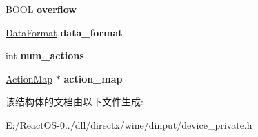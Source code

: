 \begin{DoxyCompactItemize}
B\+O\+OL {\bfseries overflow}
\item 
\mbox{\label{struct_i_direct_input_device_impl_a7a27a9acbe1dfd670ba35ad37ea206e8}} 
\hyperlink{struct_data_format}{Data\+Format} {\bfseries data\+\_\+format}
\item 
\mbox{\label{struct_i_direct_input_device_impl_a19c0b18ee471fde16157a8d05901de80}} 
int {\bfseries num\+\_\+actions}
\item 
\mbox{\label{struct_i_direct_input_device_impl_a02de0b8b9e5e8ffa80207ce5e81e223b}} 
\hyperlink{struct_action_map}{Action\+Map} $\ast$ {\bfseries action\+\_\+map}
\end{DoxyCompactItemize}


该结构体的文档由以下文件生成\+:\begin{DoxyCompactItemize}
\item 
E\+:/\+React\+O\+S-\/0../dll/directx/wine/dinput/device\+\_\+private.\+h\end{DoxyCompactItemize}
